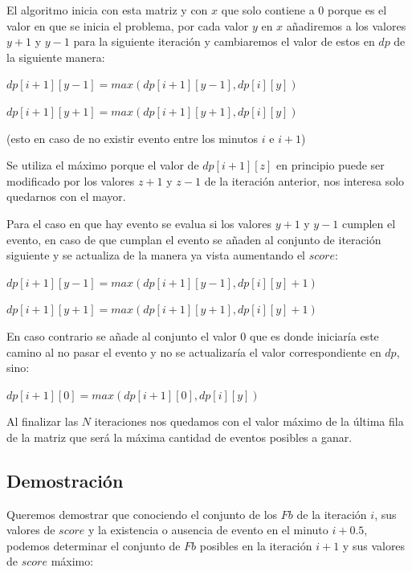 \documentclass[12pt,a4paper]{report}
\begin{document}
El algoritmo inicia con esta matriz y con $x$ que solo contiene a 0 porque es el valor en que se inicia el problema, por cada valor $y$ en $x$ añadiremos a los valores $y+1$ y $y-1$ para la siguiente iteración y cambiaremos el valor de estos en $dp$ de la siguiente manera:

\smallskip

$dp[i+1][y-1] = max(dp[i+1][y-1], dp[i][y])$

$dp[i+1][y+1] = max(dp[i+1][y+1], dp[i][y])$

\smallskip

(esto en caso de no existir evento entre los minutos $i$ e $i+1$)

Se utiliza el máximo porque el valor de $dp[i+1][z]$ en principio puede ser modificado por los valores $z+1$ y $z-1$ de la iteración anterior, nos interesa solo quedarnos con el mayor.

Para el caso en que hay evento se evalua si los valores $y+1$ y $y-1$ cumplen el evento, en caso de que cumplan el evento se añaden al conjunto de iteración siguiente y se actualiza de la manera ya vista aumentando el $score$:

\smallskip

$dp[i+1][y-1] = max(dp[i+1][y-1], dp[i][y] + 1)$

$dp[i+1][y+1] = max(dp[i+1][y+1], dp[i][y] + 1)$

\smallskip

En caso contrario se añade al conjunto el valor 0 que es donde iniciaría este camino al no pasar el evento y no se actualizaría el valor correspondiente en $dp$, sino:

\smallskip

$dp[i+1][0] = max(dp[i+1][0], dp[i][y])$

\smallskip

Al finalizar las $N$ iteraciones nos quedamos con el valor máximo de la última fila de la matriz que será la máxima cantidad de eventos posibles a ganar.

\subsection{Demostración}

Queremos demostrar que conociendo el conjunto de los $Fb$ de la iteración $i$, sus valores de $score$ y la existencia o ausencia de evento en el minuto $i + 0.5$, podemos determinar el conjunto de $Fb$ posibles en la iteración $i+1$ y sus valores de $score$ máximo:
\end{document}
